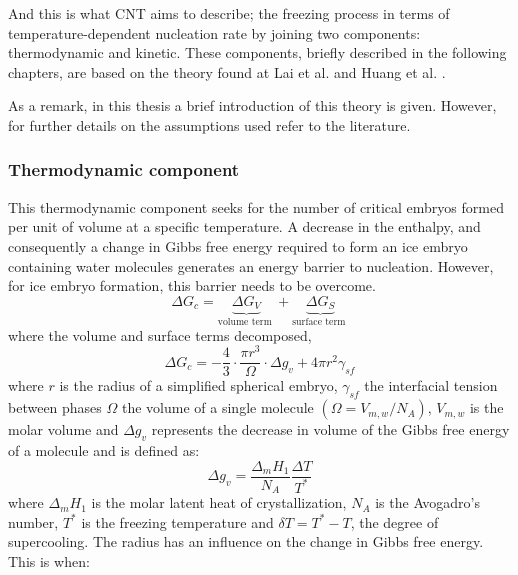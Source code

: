 \noindent And this is what CNT aims to describe; the freezing process in terms of temperature-dependent nucleation rate by joining two components: thermodynamic and kinetic. These components, briefly described in the following chapters, are based on the theory found at Lai et al. \cite{wu_lai_zhang_2015} and Huang et al. \cite{huang_wang_li_2020}.

\noindent As a remark, in this thesis a brief introduction of this theory is given. However, for further details on the assumptions used refer to the literature.

\subsubsection*{Thermodynamic component}

\setlength{\parindent}{0.5cm} This thermodynamic component seeks for the number of critical embryos formed per unit of volume at a specific temperature. A decrease in the enthalpy, and consequently a change in Gibbs free energy required to form an ice embryo containing water molecules generates an energy barrier to nucleation. However, for ice embryo formation, this barrier needs to be overcome. 
\begin{equation}
	\label{2.16}
	\Delta G_{c}=\underbrace{\Delta G_{V}}_{\text {volume term }}+\underbrace{\Delta G_{S}}_{\text {surface term }}
\end{equation}
where the volume and surface terms decomposed,
\begin{equation}
	\label{2.17}
	\Delta G_{c}=-\frac{4}{3} \cdot \frac{\pi r^{3}}{\Omega} \cdot \Delta g_{v}+4 \pi r^{2} \gamma_{s f}
\end{equation}
where $r$ is the radius of a simplified spherical embryo, $\gamma_{sf}$ the interfacial tension between phases $\Omega$ the volume of a single molecule $
\left(\Omega=V_{m, w} / N_{A}\right)$, $V_{m, w}$ is the molar volume and $\Delta g_{v}$ represents the decrease in volume of the Gibbs free energy of a molecule and is defined as:
\begin{equation}
	\label{2.18}
	\Delta g_{v}=\frac{\Delta_{m} H_{1}}{N_{A}} \frac{\Delta T}{T^{*}}
\end{equation}
where $\Delta_{m} H_{1}$ is the molar latent heat of crystallization, $N_{A}$ is the Avogadro's number, $T^{*}$ is the freezing temperature and $\delta T=T^* - T$, the degree of supercooling.
The radius has an influence on the change in Gibbs free energy. This is when:
